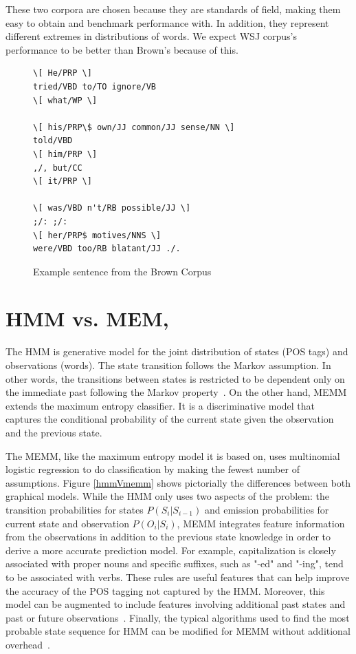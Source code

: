 \documentclass{acm_proc_article-sp}
\begin{document}
These two corpora are chosen because they are standards of field, making them easy to obtain and benchmark performance with. In addition, they represent different extremes in distributions of words. We expect WSJ corpus's performance to be better than Brown's because of this.

\begin{figure}[ht]
 \begin{Verbatim}[frame=single,framesep=5mm]
\[ He/PRP \]
tried/VBD to/TO ignore/VB
\[ what/WP \]

\[ his/PRP\$ own/JJ common/JJ sense/NN \]
told/VBD
\[ him/PRP \]
,/, but/CC
\[ it/PRP \]

\[ was/VBD n't/RB possible/JJ \]
;/: ;/:
\[ her/PRP$ motives/NNS \]
were/VBD too/RB blatant/JJ ./.
\end{Verbatim}
\caption{Example sentence from the Brown Corpus~\cite{brownCorpus} \label{brownExample}}
\end{figure}

\section{HMM vs. MEM,}
The HMM is generative model for the joint distribution of states (POS tags) and observations (words). The state transition follows the Markov assumption. In other words, the transitions between states is restricted to be dependent only on the immediate past following the Markov property~\cite{nlpBook}. On the other hand, MEMM extends the maximum entropy classifier. It is a discriminative model that captures the conditional probability of the current state given the observation and the previous state.

The MEMM, like the maximum entropy model it is based on, uses multinomial logistic regression to do classification by making the fewest number of assumptions. Figure \ref{hmmVmemm} shows pictorially the differences between both graphical models. While the HMM only uses two aspects of the problem: the transition probabilities for states $P( S_i | S_{i-1} )$ and emission probabilities for current state and observation $P( O_i | S_i )$, MEMM integrates feature information from the observations in addition to the previous state knowledge in order to derive a more accurate prediction model. For example, capitalization is closely associated with proper nouns and specific suffixes, such as "-ed" and "-ing", tend to be associated with verbs. These rules are useful features that can help improve the accuracy of the POS tagging not captured by the HMM. Moreover, this model can be augmented to include features involving additional past states and past or future observations~\cite{nlpBook}. Finally, the typical algorithms used to find the most probable state sequence for HMM can be modified for MEMM without additional overhead~\cite{memmPaper}.
\end{document}
